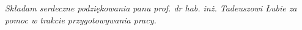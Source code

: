 \newpage
\thispagestyle{empty}
\begin{flushright}
\textit{Składam serdeczne podziękowania
panu prof. dr hab. inż. Tadeuszowi Łubie
za pomoc w trakcie przygotowywania pracy.}
\end{flushright}